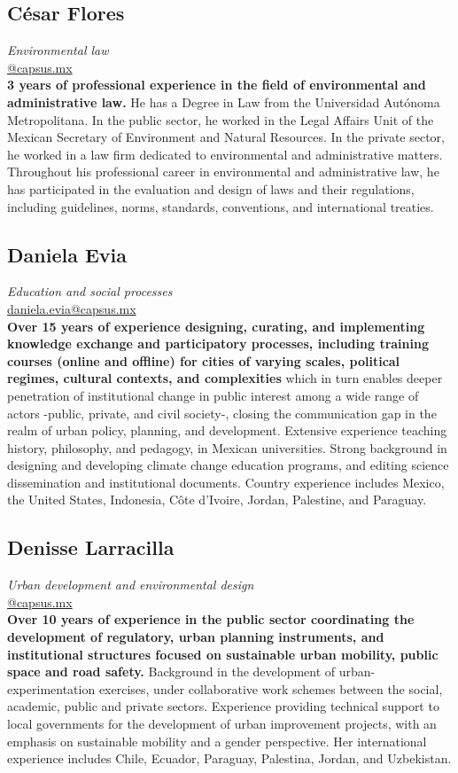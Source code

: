 \documentclass[
	a4paper,
	12pt,
	unnumberedsections,
]{CSSullivanBusinessReport}
\begin{document}
\subsection*{César Flores}
\textit{Environmental law} \\
\href{mailto:@capsus.mx}{@capsus.mx} \\[0.5em]
\textbf{3 years of professional experience in the field of environmental and administrative law.} He has a Degree in Law from the Universidad Autónoma Metropolitana. In the public sector, he worked in the Legal Affairs Unit of the Mexican Secretary of Environment and Natural Resources. In the private sector, he worked in a law firm dedicated to environmental and administrative matters. Throughout his professional career in environmental and administrative law, he has participated in the evaluation and design of laws and their regulations, including guidelines, norms, standards, conventions, and international treaties.

\subsection*{Daniela Evia}
\textit{Education and social processes} \\
\href{mailto:daniela.evia@capsus.mx}{daniela.evia@capsus.mx} \\[0.5em]
\textbf{Over 15 years of experience designing, curating, and implementing knowledge exchange and participatory processes, including training courses (online and offline) for cities of varying scales, political regimes, cultural contexts, and complexities} which in turn enables deeper penetration of institutional change in public interest among a wide range of actors -public, private, and civil society-, closing the communication gap in the realm of urban policy, planning, and development. Extensive experience teaching history, philosophy, and pedagogy, in Mexican universities. Strong background in designing and developing climate change education programs, and editing science dissemination and institutional documents. Country experience includes Mexico, the United States, Indonesia, Côte d'Ivoire, Jordan, Palestine, and Paraguay.

\subsection*{Denisse Larracilla}
\textit{Urban development and environmental design} \\
\href{mailto:@capsus.mx}{@capsus.mx} \\[0.5em]
\textbf{Over 10 years of experience in the public sector coordinating the development of regulatory, urban planning instruments, and institutional structures focused on sustainable urban mobility, public space and road safety.} Background in the development of urban-experimentation exercises, under collaborative work schemes between the social, academic, public and private sectors. Experience providing technical support to local governments for the development of urban improvement projects, with an emphasis on sustainable mobility and a gender perspective. Her international experience includes Chile, Ecuador, Paraguay, Palestina, Jordan, and Uzbekistan.
\end{document}
